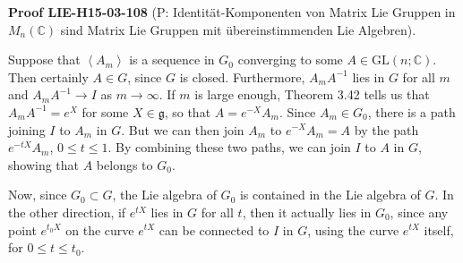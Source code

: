 \documentclass[10pt, letterpaper]{article}
\newcommand{\C}{\mathbb{C}}
\newcommand{\CustomHeading}[3]{%
  \par\medskip\noindent%
  \textbf{#1 #2} \textnormal{(#3)}.\enskip%
}
\newenvironment{PROOF}[2]{\begin{unitbox}\CustomHeading{Proof}{#1}{#2}}{\end{unitbox}}
\begin{document}
\begin{PROOF}{LIE-H15-03-108}{P: Identität-Komponenten von Matrix Lie Gruppen in $M_n(\C)$ sind Matrix Lie Gruppen mit übereinstimmenden Lie Algebren}
Suppose that $\left\langle A_{m}\right\rangle$ is a sequence in $G_{0}$ converging to some $A \in \mathrm{GL}(n ; \mathbb{C})$. Then certainly $A \in G$, since $G$ is closed. Furthermore, $A_{m} A^{-1}$ lies in $G$ for all $m$ and $A_{m} A^{-1} \rightarrow I$ as $m \rightarrow \infty$. If $m$ is large enough, Theorem 3.42 tells us that $A_{m} A^{-1}=e^{X}$ for some $X \in \mathfrak{g}$, so that $A=e^{-X} A_{m}$. Since $A_{m} \in G_{0}$, there is a path joining $I$ to $A_{m}$ in $G$. But we can then join $A_{m}$ to $e^{-X} A_{m}=A$ by the path $e^{-t X} A_{m}$, $0 \leq t \leq 1$. By combining these two paths, we can join $I$ to $A$ in $G$, showing that $A$ belongs to $G_{0}$.

Now, since $G_{0} \subset G$, the Lie algebra of $G_{0}$ is contained in the Lie algebra of $G$. In the other direction, if $e^{t X}$ lies in $G$ for all $t$, then it actually lies in $G_{0}$, since any point $e^{t_{0} X}$ on the curve $e^{t X}$ can be connected to $I$ in $G$, using the curve $e^{t X}$ itself, for $0 \leq t \leq t_{0}$.
\end{PROOF}
\end{document}
